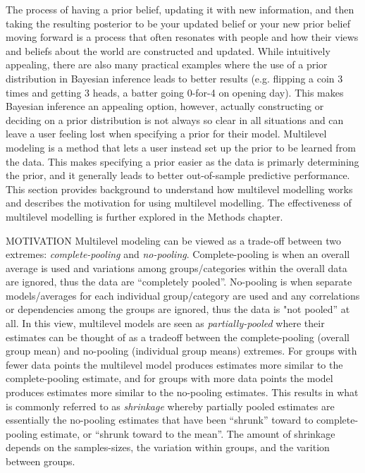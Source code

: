 The process of having a prior belief, updating it with new information, and then taking the resulting posterior to be your updated belief or your new prior belief moving forward is a process that often resonates with people and how their views and beliefs about the world are constructed and updated. While intuitively appealing, there are also many practical examples where the use of a prior distribution in Bayesian inference leads to better results (e.g. flipping a coin 3 times and getting 3 heads, a batter going 0-for-4 on opening day). This makes Bayesian inference an appealing option, however, actually constructing or deciding on a prior distribution is not always so clear in all situations and can leave a user feeling lost when specifying a prior for their model. Multilevel modeling is a method that lets a user instead set up the prior to be learned from the data. This makes specifying a prior easier as the data is primarly determining the prior, and it generally leads to better out-of-sample predictive performance. This section provides background to understand how multilevel modelling works and describes the motivation for using multilevel modelling. The effectiveness of multilevel modelling is further explored in the Methods chapter.

MOTIVATION
Multilevel modeling can be viewed as a trade-off between two extremes: \textit{complete-pooling} and \textit{no-pooling}. Complete-pooling is when an overall average is used and variations among groups/categories within the overall data are ignored, thus the data are “completely pooled”. No-pooling is when separate models/averages for each individual group/category are used and any correlations or dependencies among the groups are ignored, thus the data is "not pooled” at all. In this view, multilevel models are seen as \textit{partially-pooled} where their estimates can be thought of as a tradeoff between the complete-pooling (overall group mean) and no-pooling (individual group means) extremes. For groups with fewer data points the multilevel model produces estimates more similar to the complete-pooling estimate, and for groups with more data points the model produces estimates more similar to the no-pooling estimates. This results in what is commonly referred to as \textit{shrinkage} whereby partially pooled estimates are essentially the no-pooling estimates that have been “shrunk” toward to complete-pooling estimate, or “shrunk toward to the mean”. The amount of shrinkage depends on the samples-sizes, the variation within groups, and the varition between groups.

